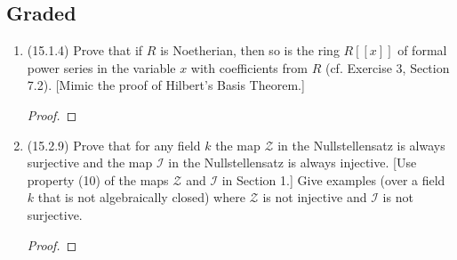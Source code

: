 \documentclass[11pt]{article}
\begin{document}
\subsection*{Graded}
\begin{enumerate}
    \item (15.1.4) Prove that if $R$ is Noetherian, then so is the ring $R[[x]]$ of formal power series in the variable $x$ with coefficients from $R$ (cf. Exercise 3, Section 7.2). [Mimic the proof of Hilbert's Basis Theorem.] \begin{proof}
        
    \end{proof}
    \item (15.2.9) Prove that for any field $k$ the map $\mathcal{Z}$ in the Nullstellensatz is always surjective and the map $\mathcal{I}$ in the Nullstellensatz is always injective. [Use property (10) of the maps $\mathcal{Z}$ and $\mathcal{I}$ in Section 1.] Give examples (over a field $k$ that is not algebraically closed) where $\mathcal{Z}$ is not injective and $\mathcal{I}$ is not surjective. \begin{proof}
        
    \end{proof}
\end{enumerate}
\end{document}
